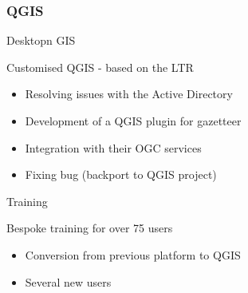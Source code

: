 \subsubsection{QGIS}
\begin{frame}{Desktopn GIS}
	\begin{block}{Customised QGIS - based on the LTR}
		\begin{itemize}
			\item Resolving issues with the Active Directory
			\item Development of a QGIS plugin for gazetteer
			\item Integration with their OGC services
			\item Fixing bug (backport to QGIS project)
		\end{itemize}
	\end{block}
\end{frame}

\begin{frame}{Training}
	\begin{block}{Bespoke training for over 75 users}
		\begin{itemize}
			\item Conversion from previous platform to QGIS
			\item Several new users
		\end{itemize}
	\end{block}
\end{frame}

